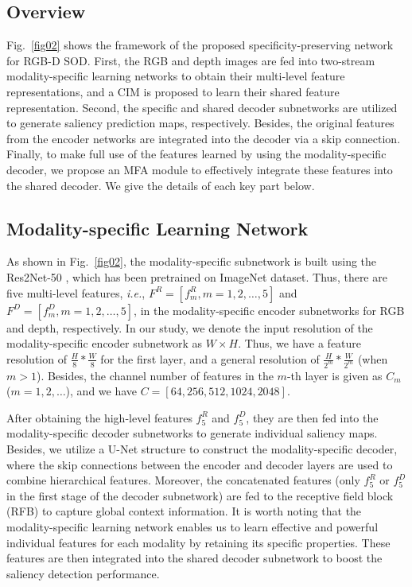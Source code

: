 \documentclass[10pt,twocolumn,letterpaper]{article}
\def\ie{\emph{i.e.}}
\begin{document}
\subsection{Overview}
\label{sec3.1}

Fig.~\ref{fig02} shows the framework of the proposed specificity-preserving network for RGB-D SOD. First, the RGB and depth images are fed into two-stream modality-specific learning networks to obtain their multi-level feature representations, and a CIM is proposed to learn their shared feature representation. Second, the specific and shared decoder subnetworks are utilized to generate saliency prediction maps, respectively. Besides, the original features from the encoder networks are integrated into the decoder via a skip connection. Finally, to make full use of the features learned by using the modality-specific decoder, we propose an MFA module to effectively integrate these features into the shared decoder. We give the details of each key part below.


\subsection{Modality-specific Learning Network}
\label{sec3.2}

As shown in Fig.~\ref{fig02}, the modality-specific subnetwork is built using the Res2Net-50 \cite{pami20Res2net}, which has been pretrained on ImageNet \cite{russakovsky2015imagenet} dataset. Thus, there are five multi-level features, \ie, $F^{R}=[f_m^{R},m=1,2,\dots,5]$ and $F^{D}=[f_m^{D},m=1,2,\dots,5]$, in the modality-specific encoder subnetworks for RGB and depth, respectively. In our study, we denote the input resolution of the modality-specific encoder subnetwork as $W\times{H}$. Thus, we have a feature resolution of $\frac{H}{8}*\frac{W}{8}$ for the first layer, and a general resolution of $\frac{H}{2^{m}}*\frac{W}{2^{m}}$ (when $m>1$). Besides, the channel number of features in the $m$-th layer is given as $C_m$ ($m=1,2,\dots$), and we have $C=[64,256,512,1024,2048]$.

After obtaining the high-level features $f_5^{R}$ and $f_5^{D}$, they are then fed into the modality-specific decoder subnetworks to generate individual saliency maps. Besides, we utilize a U-Net \cite{ronneberger2015u} structure to construct the modality-specific decoder, where the skip connections between the encoder and decoder layers are used to combine hierarchical features. Moreover, the concatenated features (only $f_5^{R}$ or $f_5^{D}$ in the first stage of the decoder subnetwork) are fed to the receptive field block (RFB) \cite{wu2019cascaded} to capture global context information. It is worth noting that the modality-specific learning network enables us to learn effective and powerful individual features for each modality by retaining its specific properties. These features are then integrated into the shared decoder subnetwork to boost the saliency detection performance.
\end{document}
